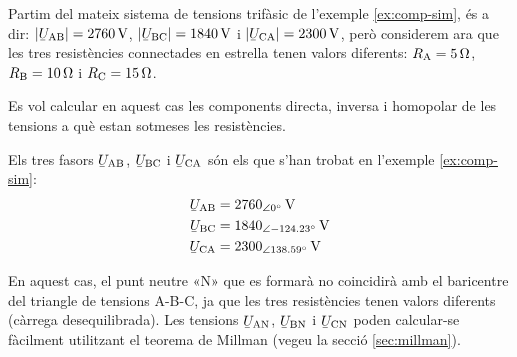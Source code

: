 \begin{exemple}\label{ex:comp-sim-deseq}
    Partim del mateix sistema de tensions trifàsic de l'exemple \vref{ex:comp-sim}, és a dir: $|\cmplx{U}\ped{AB}| =  \qty{2760}{V}$, $|\cmplx{U}\ped{BC}| = \qty{1840}{V}$ i
    $|\cmplx{U}\ped{CA}| = \qty{2300}{V}$, però considerem ara que les tres resistències connectades en estrella tenen valors diferents:  $R_\mathrm{A}=\qty{5}{\ohm}$, $R_\mathrm{B}=\qty{10}{\ohm}$ i $R_\mathrm{C}=\qty{15}{\ohm}$.

    \begin{center}
        
    \end{center}

    Es vol calcular en aquest cas  les components directa, inversa i homopolar de les tensions a què estan sotmeses les resistències.

    Els tres fasors $\cmplx{U}\ped{AB} $, $\cmplx{U}\ped{BC} $ i $\cmplx{U}\ped{CA}$ són els que s'han trobat en l'exemple \ref{ex:comp-sim}:
    \begin{align*}
        \cmplx{U}\ped{AB} &= \qtypd{2760}{0}{V} \\
        \cmplx{U}\ped{BC} &= \qtypd{1840}{-124,23}{V} \\
        \cmplx{U}\ped{CA} &= \qtypd{2300}{138,59}{V}
    \end{align*}

    En aquest cas, el punt neutre «N» que es formarà no coincidirà amb el baricentre del triangle de tensions A-B-C, ja que les tres resistències tenen valors diferents (càrrega  desequilibrada). Les tensions $\cmplx{U}\ped{AN} $, $\cmplx{U}\ped{BN} $ i $\cmplx{U}\ped{CN}$ poden calcular-se fàcilment utilitzant el teorema de Millman (vegeu la secció \vref{sec:millman}).


\end{exemple}
